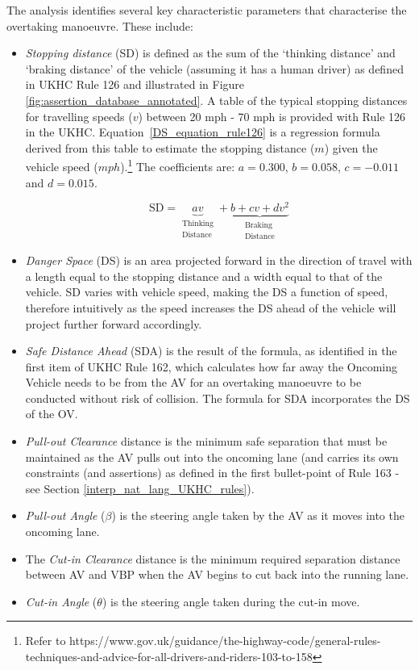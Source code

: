 The analysis identifies several key characteristic parameters that characterise the overtaking manoeuvre. These include:
\begin{itemize}
    \item \emph{Stopping distance} (SD) is defined as the sum of the `thinking distance' and `braking distance' of the vehicle (assuming it has a human driver) as defined in UKHC Rule 126 and illustrated in Figure \ref{fig:assertion_database_annotated}.
    A table of the typical stopping distances for travelling speeds ($v$) between 20 mph - 70 mph is provided with Rule 126 in the UKHC.
    Equation~\ref{DS_equation_rule126} is a regression formula derived from this table to estimate the stopping distance ($m$) given the vehicle speed ($mph$).\footnote{Refer to https://www.gov.uk/guidance/the-highway-code/general-rules-techniques-and-advice-for-all-drivers-and-riders-103-to-158} The coefficients are: $a=0.300$, $b=0.058$, $c=-0.011$ and $d=0.015$.
    
\begin{equation} 
\label{DS_equation_rule126}
\text{SD} = \underbrace{av }_{\substack{\text{Thinking} \\ \text{Distance}}} + \underbrace{b + cv + dv^2}_{\substack{\text{Braking} \\ \text{Distance}}}
\end{equation}

    \item \emph{Danger Space} (DS) is an area projected forward in the direction of travel with a length equal to the stopping distance and a width equal to that of the vehicle.
    SD varies with vehicle speed, making the DS a function of speed, therefore intuitively as the speed increases the DS ahead of the vehicle will project further forward accordingly.
    
    \item \emph{Safe Distance Ahead} (SDA) is the result of the formula, as identified in the first item of UKHC Rule 162, which calculates how far away the Oncoming Vehicle needs to be from the AV for an overtaking manoeuvre to be conducted without risk of collision. The formula for SDA incorporates the DS of the OV. 
    
    \item \emph{Pull-out Clearance} distance is the minimum safe separation that must be maintained as the AV pulls out into the oncoming lane (and carries its own constraints (and assertions) as defined in the first bullet-point of Rule 163 - see Section \ref{interp_nat_lang_UKHC_rules}).
    
    \item \emph{Pull-out Angle} ($\beta$) is the steering angle taken by the AV as it moves into the oncoming lane.
    \item The \emph{Cut-in Clearance} distance is the minimum required separation distance between AV and VBP when the AV begins to cut back into the running lane.
    
    \item \emph{Cut-in Angle} ($\theta$) is the steering angle taken during the cut-in move.
\end{itemize}

